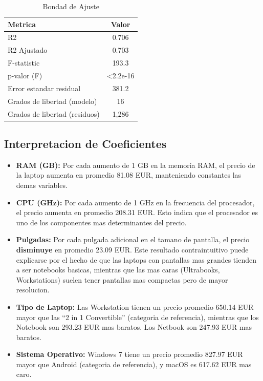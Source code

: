 \documentclass[12pt,a4paper]{article}
\begin{document}
\begin{table}[H]
\centering
\caption{Bondad de Ajuste}
\begin{tabular}{lc}
\toprule
\textbf{Metrica} & \textbf{Valor} \\
\midrule
R2 & 0.706 \\
R2 Ajustado & 0.703 \\
F-statistic & 193.3 \\
p-valor (F) & \textless{}2.2e-16 \\
Error estandar residual & 381.2 \\
Grados de libertad (modelo) & 16 \\
Grados de libertad (residuos) & 1,286 \\
\bottomrule
\end{tabular}
\end{table}

\subsection{Interpretacion de Coeficientes}

\begin{itemize}
    \item \textbf{RAM (GB):} Por cada aumento de 1 GB en la memoria RAM, el precio de la laptop aumenta en promedio 81.08 EUR, manteniendo constantes las demas variables.
    
    \item \textbf{CPU (GHz):} Por cada aumento de 1 GHz en la frecuencia del procesador, el precio aumenta en promedio 208.31 EUR. Esto indica que el procesador es uno de los componentes mas determinantes del precio.
    
    \item \textbf{Pulgadas:} Por cada pulgada adicional en el tamano de pantalla, el precio \textbf{disminuye} en promedio 23.09 EUR. Este resultado contraintuitivo puede explicarse por el hecho de que las laptops con pantallas mas grandes tienden a ser notebooks basicas, mientras que las mas caras (Ultrabooks, Workstations) suelen tener pantallas mas compactas pero de mayor resolucion.
    
    \item \textbf{Tipo de Laptop:} Las Workstation tienen un precio promedio 650.14 EUR mayor que las ``2 in 1 Convertible'' (categoria de referencia), mientras que los Notebook son 293.23 EUR mas baratos. Los Netbook son 247.93 EUR mas baratos.
    
    \item \textbf{Sistema Operativo:} Windows 7 tiene un precio promedio 827.97 EUR mayor que Android (categoria de referencia), y macOS es 617.62 EUR mas caro.
\end{itemize}
\end{document}
